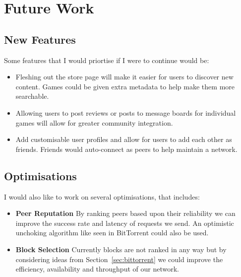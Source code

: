 \section{Future Work}

\subsection*{New Features}

Some features that I would priortise if I were to continue would be:

\begin{itemize}
  \item Fleshing out the store page will make it easier for users to discover new content. Games could be given extra metadata to help make them more searchable.
  \item Allowing users to post reviews or posts to message boards for individual games will allow for greater community integration.
  \item Add customisable user profiles and allow for users to add each other as friends. Friends would auto-connect as peers to help maintain a network.
\end{itemize}


\subsection*{Optimisations}

I would also like to work on several optimisations, that includes:

\begin{itemize}
  \item \textbf{Peer Reputation} By ranking peers based upon their reliability we can improve the success rate and latency of requests we send. An optimistic unchoking algorithm like seen in BitTorrent could also be used.
  \item \textbf{Block Selection} Currently blocks are not ranked in any way but by considering ideas from Section~\ref{sec:bittorrent} we could improve the efficiency, availability and throughput of our network.
\end{itemize}
